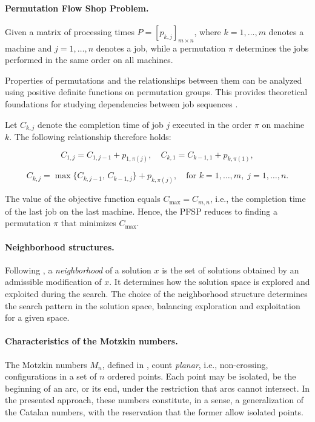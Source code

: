 \documentclass[runningheads]{llncs}
\begin{document}
\paragraph{Permutation Flow Shop Problem.}
Given a matrix of processing times $P = [p_{k,j}]_{m \times n}$, where $k=1,\dots,m$ denotes a machine and $j=1,\dots,n$ denotes a job, while a permutation $\pi$ determines the jobs performed in the same order on all machines.

Properties of permutations and the relationships between them can be analyzed using positive definite functions on permutation groups. This provides theoretical foundations for studying dependencies between job sequences \cite{Bozejko2015}.

Let $C_{k,j}$ denote the completion time of job $j$ executed in the order $\pi$ on machine $k$. The following relationship therefore holds:


\begin{equation}\label{eq_c_1j_C_k1}
    C_{1,j} = C_{1,j-1} + p_{1,\pi(j)},\quad
    C_{k,1} = C_{k-1,1} + p_{k,\pi(1)},
\end{equation}

\begin{equation}\label{eq_c_kj}
C_{k,j} = \max\{C_{k,j-1},\, C_{k-1,j}\} + p_{k,\pi(j)}, \quad \text{for } k=1,\dots,m,\; j=1,\dots,n.
\end{equation}

The value of the objective function equals $C_{\max} = C_{m,n}$, i.e., the completion time of the last job on the last machine. Hence, the PFSP reduces to finding a permutation $\pi$ that minimizes $C_{\max}$.

\paragraph{Neighborhood structures.}
Following \cite{vanlaarhoven1992}, a \emph{neighborhood} of a solution $x$ is the set of solutions obtained by an admissible modification of $x$. It determines how the solution space is explored and exploited during the search. The choice of the neighborhood structure determines the search pattern in the solution space, balancing exploration and exploitation for a given space.

\paragraph{Characteristics of the Motzkin numbers.}
The Motzkin numbers $M_n$, defined in \cite{Motzkin_PWR}, count \emph{planar}, i.e., non-crossing, configurations in a set of $n$ ordered points. Each point may be isolated, be the beginning of an arc, or its end, under the restriction that arcs cannot intersect. In the presented approach, these numbers constitute, in a sense, a generalization of the Catalan numbers, with the reservation that the former allow isolated points.
\end{document}
